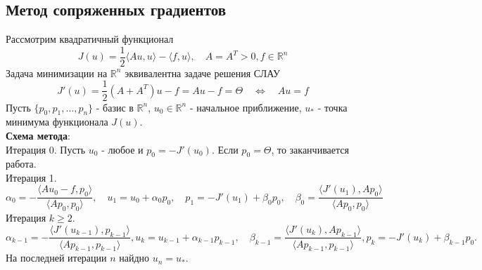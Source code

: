 \documentclass[A4]{article}
\begin{document}
\subsection{Метод сопряженных градиентов}
Рассмотрим квадратичный функционал 
\begin{equation*}
J(u)=\frac{1}{2}\langle Au,u\rangle-\langle f,u\rangle,\quad A=A^T>0,f\in\mathbb{R}^n
\end{equation*}
Задача минимизации на $\mathbb{R}^n$ эквивалентна задаче решения СЛАУ
\begin{equation*}
J'(u)=\frac{1}{2}(A+A^T)u-f=Au-f=\Theta\quad\Leftrightarrow\quad Au=f
\end{equation*}
Пусть $\{p_0,p_1,\ldots,p_n \}$ - базис в $\mathbb{R}^n$, $u_0\in\mathbb{R}^n$ - начальное приближение, $u_*$ - точка минимума функционала $J(u)$.\\
\textbf{Схема метода}:\\
Итерация 0. Пусть $u_0$ - любое и $p_0=-J'(u_0)$. Если $p_0=\Theta$, то заканчивается работа.\\
Итерация 1. 
\begin{equation*}
\alpha_0=-\frac{\langle Au_0-f,p_0\rangle}{\langle Ap_0,p_0\rangle},\quad u_1=u_0+\alpha_0p_0,\quad p_1=-J'(u_1)+\beta_0p_0,\quad\beta_0=\frac{\langle J'(u_1),Ap_0\rangle}{\langle Ap_0,p_0\rangle}
\end{equation*}
Итерация $k\geqslant 2$. 
\begin{equation*}
\alpha_{k-1}=-\frac{\langle J'(u_{k-1}),p_{k-1}\rangle}{\langle Ap_{k-1},p_{k-1}\rangle},u_k=u_{k-1}+\alpha_{k-1}p_{k-1},\quad \beta_{k-1}=\frac{\langle J'(u_{k}),Ap_{k-1}\rangle}{\langle Ap_{k-1},p_{k-1}\rangle},p_k=-J'(u_k)+\beta_{k-1} p_0.
\end{equation*}
На последней итерации $n$ найдно $u_n=u_*$. 
\end{document}
